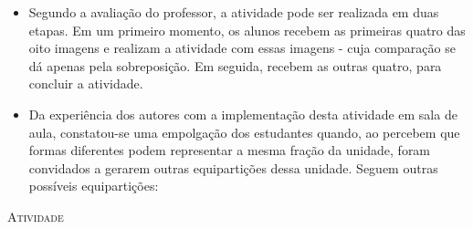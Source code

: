 \documentclass[10 pt,usenames,dvipsnames, oneside]{article}
\begin{document}
\begin{goals}
\begin{itemize}
\item Segundo a avaliação do professor, a atividade pode ser realizada em duas etapas. Em um primeiro momento, os alunos recebem as primeiras quatro das oito imagens e realizam a atividade com essas imagens - cuja comparação se dá apenas pela sobreposição. Em seguida, recebem as outras quatro, para concluir a atividade. 

\item Da experiência dos autores com a implementação desta atividade em sala de aula, constatou-se uma empolgação dos estudantes quando, ao percebem que formas diferentes podem representar a mesma fração da unidade, foram convidados a gerarem outras equipartições dessa unidade. Seguem outras possíveis equipartições:


  \begin{center}
  
    \quad\quad\quad
        \quad\quad\quad
  \end{center}
\end{itemize} %

\end{goals}

\bigskip
\begin{center}
{\huge \scshape Atividade}
\end{center}
\fi
\end{document}
